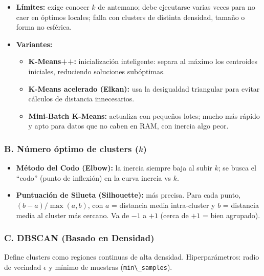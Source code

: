 \documentclass[12pt]{book} %
\providecommand{\tightlist}{%
  \setlength{\itemsep}{0pt}\setlength{\parskip}{0pt}}
\begin{document}
\begin{itemize}
\tightlist
\item
  \textbf{Límites:} exige conocer \(k\) de antemano; debe ejecutarse
  varias veces para no caer en óptimos locales; falla con clusters de
  distinta densidad, tamaño o forma no esférica.
\item
  \textbf{Variantes:}

  \begin{itemize}
  \tightlist
  \item
    \textbf{K-Means++:} inicialización inteligente: separa al máximo los
    centroides iniciales, reduciendo soluciones subóptimas.
  \item
    \textbf{K-Means acelerado (Elkan):} usa la desigualdad triangular
    para evitar cálculos de distancia innecesarios.
  \item
    \textbf{Mini-Batch K-Means:} actualiza con pequeños lotes; mucho más
    rápido y apto para datos que no caben en RAM, con inercia algo peor.
  \end{itemize}
\end{itemize}

\hypertarget{b.-nuxfamero-uxf3ptimo-de-clusters-k}{%
\subsubsection{\texorpdfstring{B. Número óptimo de clusters
(\(k\))}{B. Número óptimo de clusters (k)}}\label{b.-nuxfamero-uxf3ptimo-de-clusters-k}}

\begin{itemize}
\tightlist
\item
  \textbf{Método del Codo (Elbow):} la inercia siempre baja al subir
  \(k\); se busca el ``codo'' (punto de inflexión) en la curva inercia
  vs \(k\).
\item
  \textbf{Puntuación de Silueta (Silhouette):} más precisa. Para cada
  punto, \((b-a)/\max(a,b)\), con \(a\) = distancia media intra-cluster
  y \(b\) = distancia media al cluster más cercano. Va de \(-1\) a
  \(+1\) (cerca de \(+1\) = bien agrupado).
\end{itemize}

\hypertarget{c.-dbscan-basado-en-densidad}{%
\subsubsection{C. DBSCAN (Basado en
Densidad)}\label{c.-dbscan-basado-en-densidad}}

Define clusters como regiones continuas de alta densidad.
Hiperparámetros: radio de vecindad \(\epsilon\) y mínimo de muestras
(\passthrough{\lstinline!min\_samples!}).
\end{document}
